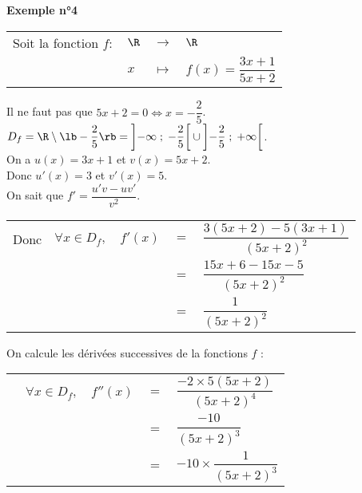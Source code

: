 \newpage

\textbf{Exemple n°4} \\

\begin{tabular}{llll}
\hspace{-.3cm} Soit la fonction $f :$ & $\R$ & $\longrightarrow$ & $\R$ \\
& $x$ & $\longmapsto$ & $f(x) = \dfrac{3x + 1}{5x + 2}$ \\
\end{tabular}

\vspace*{.3cm}

Il ne faut pas que $5x +2 = 0 \Longleftrightarrow x= -\dfrac{2}{5}$. \\

$D_f = \R \setminus \lb -\dfrac{2}{5} \rb = \left]-\infty \; ; \; -\dfrac{2}{5}\right[\cup\left]-\dfrac{2}{5} \; ; \; +\infty\right[$. \\

On a $u(x) = 3x + 1$ et $v(x) = 5x +2$. \\
Donc $u'(x) = 3$ et $v'(x) = 5$. \\

On sait que $f' = \dfrac{u'v - uv'}{v^2}$.

\begin{tabular}{lllll}
\hspace{-.3cm} Donc & $\forall x \in D_f,$ & $ f'(x)$ & $ = $ & $ \dfrac{3\left(5x +2\right)-5\left(3x +1\right)}{\left(5x+2\right)^2}$ \vspace*{.3cm} \\
& & & $=$ & $\dfrac{15x + 6 - 15x - 5}{\left(5x+2\right)^2}$ \vspace*{.3cm} \\
& & & $=$ & $\dfrac{1}{\left(5x+2\right)^2}$ \vspace*{.3cm} \\
\end{tabular}

On calcule les dérivées successives de la fonctions $f$ : \\

\begin{tabular}{lllll}
& $\forall x \in D_f,$ & $f''(x)$ & $=$ & $\dfrac{-2 \times 5\left(5x + 2\right)}{\left(5x+2\right)^4}$ \vspace*{.3cm} \\
& & & $=$ & $\dfrac{-10}{\left(5x+2\right)^3}$ \vspace*{.3cm} \\
& & & $=$ & $-10 \times \dfrac{1}{\left(5x +2\right)^3}$ \vspace*{.3cm} \\
\end{tabular}


